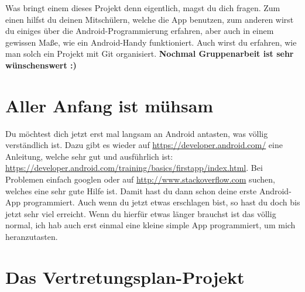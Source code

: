\documentclass[12pt,headsepline]{scrartcl}
\begin{document}
Was bringt einem dieses Projekt denn eigentlich, magst du dich fragen. Zum einen hilfst du deinen Mitschülern, welche die App benutzen, zum anderen wirst du einiges über die Android-Programmierung erfahren, aber auch in einem gewissen Maße, wie ein Android-Handy funktioniert. Auch wirst du erfahren, wie man solch ein Projekt mit Git organisiert.
\newline
\textbf{Nochmal Gruppenarbeit ist sehr wünschenswert :)}
\newpage
\section{Aller Anfang ist mühsam}

Du möchtest dich jetzt erst mal langsam an Android antasten, was völlig verständlich ist. Dazu gibt es wieder auf \url{https://developer.android.com/} eine Anleitung, welche sehr gut und ausführlich ist: \url{https://developer.android.com/training/basics/firstapp/index.html}. Bei Problemen einfach googlen oder auf \url{http://www.stackoverflow.com} suchen, welches eine sehr gute Hilfe ist.
Damit hast du dann schon deine erste Android-App programmiert. Auch wenn du jetzt etwas erschlagen bist, so hast du doch bis jetzt sehr viel erreicht. Wenn du hierfür etwas länger brauchst ist das völlig normal, ich hab auch erst einmal eine kleine simple App programmiert, um mich heranzutasten.

\section{Das Vertretungsplan-Projekt}
\end{document}

